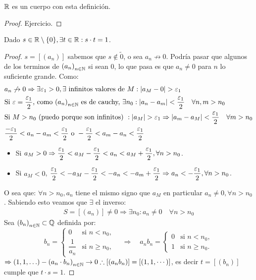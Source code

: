 \begin{prop}
	\(\mathbb{R} \) es un cuerpo con esta definición.
	\begin{proof}
		Ejercicio.
	\end{proof}
\end{prop}

\clearpage

\begin{theorem}
	Dado \(s \in \mathbb{R} \setminus \{0\}, \exists t \in \mathbb{R} : s \cdot t = 1\).
	\begin{proof}
		\(s = [(a_n)]\) sabemos que \(s \notin \tilde{0} \), o sea \(a_n \not \to 0\).
		Podría pasar que algunos de los terminos de \({(a_n)}_{n \in \mathbb{N}} \) si sean \(0 \), lo que pasa es que \(a_n \neq 0\) para \(n\) lo suficiente grande.
		Como:
		\begin{align*}
			 & a_n \not \to 0 \Rightarrow \exists \varepsilon_1 > 0, \exists \text{ infinitos valores de } M: |a_M - 0| > \varepsilon_1                                                       \\
			 & \text{Si } \varepsilon = \dfrac{\varepsilon_1}{2}\text{, como } {(a_n)}_{n \in \mathbb{N}} \text{ es de cauchy, } \exists n_0 : |a_n - a_m| < \dfrac{\varepsilon_1}{2} \quad \forall n, m > n_0 \\
			 & \text{Si } M > n_0 \text{ (puedo porque son infinitos) } : |a_M| > \varepsilon_1 \Rightarrow |a_m - a_M| < \dfrac{\varepsilon_1}{2} \quad \forall m > n_0                      \\
			 & \dfrac{-\varepsilon_1}{2} < a_n - a_m < \dfrac{\varepsilon_1}{2} \text{ o } -\dfrac{\varepsilon_1}{2} < a_m - a_n < \dfrac{\varepsilon_1}{2}
		\end{align*}\begin{itemize}
			\item Si \(a_M > 0 \Rightarrow \dfrac{\varepsilon_1}{2} < a_M - \dfrac{\varepsilon_1}{2} < a_n < a_M + \dfrac{\varepsilon_1}{2}, \forall n > n_0\).
			\item Si \(a_M < 0\), \(\dfrac{\varepsilon_1}{2} < -a_M - \dfrac{\varepsilon_1}{2} < -a_n<-a_m+ \dfrac{\varepsilon_1}{2} \Rightarrow a_n < -\dfrac{\varepsilon_1}{2}, \forall n > n_0\).
		\end{itemize}
		O sea que: \(\forall n > n_0, a_n\) tiene el mismo signo que \(a_M\) en particular \(a_n \neq 0, \forall n > n_0\). Sabiendo esto veamos que \(\exists \) el inverso: \begin{align*}
			S = [(a_n)] \neq 0 \Rightarrow \exists n_0 : a_n \neq 0 \quad \forall n > n_0
		\end{align*}
		Sea \({(b_n)}_{n \in \mathbb{N}} \subset \mathbb{Q} \) definida por:
		\[
			b_n =
			\begin{cases}
				0              & \text{si } n < n_0,    \\
				\dfrac{1}{a_n} & \text{si } n \geq n_0,
			\end{cases}
			\quad \Rightarrow \quad
			a_n b_n =
			\begin{cases}
				0 & \text{si } n < n_0,    \\
				1 & \text{si } n \geq n_0.
			\end{cases}
		\]
		\( \Rightarrow (1, 1, \ldots) - {(a_n \cdot b_n)}_{n \in \mathbb{N}} \to 0 \therefore [(a_n b_n)] = [(1, 1, \cdots)]\), es decir \(t = [(b_n)]\) cumple que \(t \cdot s = 1\).
	\end{proof}
\end{theorem}

